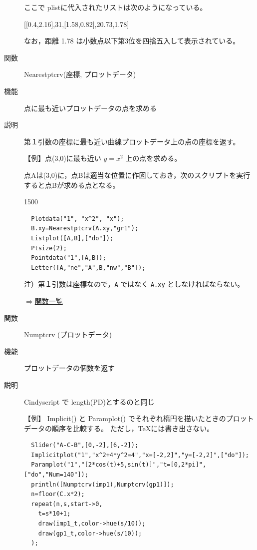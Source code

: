 \documentclass[papersize,a4paper,12pt,uplatex]{jsarticle}
\begin{document}
\begin{description}
ここで plistに代入されたリストは次のようになっている。

\hspace{10mm}    [[0.4,2.16],31,[1.58,0.82],20.73,1.78] 

なお，距離 1.78 は小数点以下第3位を四捨五入して表示されている。

\vspace{\baselineskip}
\hypertarget{nearestptcrv}{}
\item[関数]  Nearestptcrv(座標, プロットデータ)
\item[機能]  点に最も近いプロットデータの点を求める
\item[説明]  第１引数の座標に最も近い曲線プロットデータ上の点の座標を返す。

\vspace{\baselineskip}
【例】点(3,0)に最も近い $y=x^2$ 上の点を求める。

点Aは(3,0)に，点Bは適当な位置に作図しておき，次のスクリプトを実行すると点Bが求める点となる。

\begin{layer}{150}{0}
\end{layer}

\begin{verbatim}
  Plotdata("1", "x^2", "x");
  B.xy=Nearestptcrv(A.xy,"gr1");
  Listplot([A,B],["do"]);
  Ptsize(2);
  Pointdata("1",[A,B]);
  Letter([A,"ne","A",B,"nw","B"]);
\end{verbatim}

注）第１引数は座標なので，\verb|A| ではなく \verb|A.xy| としなければならない。

\begin{flushright}  \hyperlink{functionlist}{$\Rightarrow$関数一覧}\end{flushright}

\vspace{\baselineskip}
\hypertarget{numptcrv}{}
\item[関数]  Numptcrv (プロットデータ)
\item[機能]  プロットデータの個数を返す
\item[説明]  Cindyscript で length(PD)とするのと同じ

\vspace{\baselineskip}
【例】 Implicit() と Paramplot() でそれぞれ楕円を描いたときのプロットデータの順序を比較する。
  ただし，TeXには書き出さない。

\begin{verbatim}
  Slider("A-C-B",[0,-2],[6,-2]);
  Implicitplot("1","x^2+4*y^2=4","x=[-2,2]","y=[-2,2]",["do"]);
  Paramplot("1","[2*cos(t)+5,sin(t)]","t=[0,2*pi]",["do","Num=140"]);
  println([Numptcrv(imp1),Numptcrv(gp1)]);
  n=floor(C.x*2);
  repeat(n,s,start->0,
    t=s*10+1;
    draw(imp1_t,color->hue(s/10));
    draw(gp1_t,color->hue(s/10));
  );
\end{verbatim}


\end{description}
\end{document}
